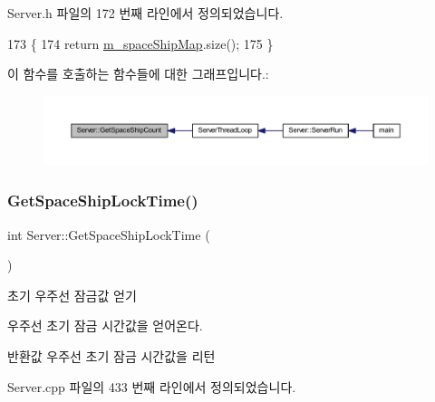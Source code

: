 Server.\+h 파일의 172 번째 라인에서 정의되었습니다.


\begin{DoxyCode}
173     \{
174         \textcolor{keywordflow}{return} \hyperlink{class_server_aa20a2aa16045180559ef43a7087e7e95}{m\_spaceShipMap}.size();
175     \}
\end{DoxyCode}
이 함수를 호출하는 함수들에 대한 그래프입니다.\+:\nopagebreak
\begin{figure}[H]
\begin{center}
\leavevmode
\includegraphics[width=350pt]{class_server_a43c5961b9519b2358127956c817a2120_icgraph}
\end{center}
\end{figure}
\mbox{\label{class_server_a4ad8b199648bad8ea03b9e161b1bcb10}} 
\subsubsection{\texorpdfstring{Get\+Space\+Ship\+Lock\+Time()}{GetSpaceShipLockTime()}}
{\footnotesize\ttfamily int Server\+::\+Get\+Space\+Ship\+Lock\+Time (\begin{DoxyParamCaption}{ }\end{DoxyParamCaption})}



초기 우주선 잠금값 얻기 

우주선 초기 잠금 시간값을 얻어온다.

\begin{DoxyReturn}{반환값}
우주선 초기 잠금 시간값을 리턴 
\end{DoxyReturn}


Server.\+cpp 파일의 433 번째 라인에서 정의되었습니다.


